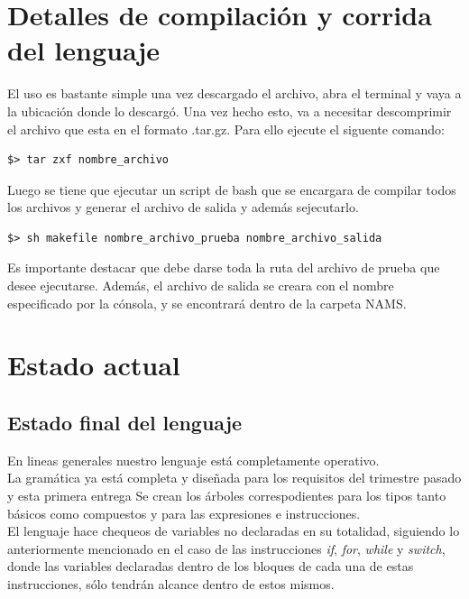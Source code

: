 \documentclass[11pt, spanish]{report}
\begin{document}
\chapter{Detalles de compilaci\'on y corrida del lenguaje}
El uso es bastante simple una vez descargado el archivo, abra el terminal y vaya a la ubicaci\'on donde lo descarg\'o. Una vez hecho esto, va a necesitar 
descomprimir el archivo que esta en el formato .tar.gz. Para ello ejecute el siguente comando:\\

\begin{verbatim}
$> tar zxf nombre_archivo
\end{verbatim}

Luego se tiene que ejecutar un script de bash que se encargara de compilar todos los archivos y generar el archivo
de salida y adem\'as sejecutarlo.\\

\begin{verbatim}
$> sh makefile nombre_archivo_prueba nombre_archivo_salida
\end{verbatim}

Es importante destacar que debe darse toda la ruta del archivo de prueba que desee ejecutarse. Adem\'as, el archivo
de salida se creara con el nombre especificado por la c\'onsola, y se encontrar\'a dentro de la carpeta NAMS.\\

\chapter{Estado actual}
\section{Estado final del lenguaje}
En lineas generales nuestro lenguaje est\'a completamente operativo.\\

La gram\'atica ya est\'a completa y dise\~nada para los requisitos del trimestre pasado y esta primera entrega Se crean los \'arboles correspodientes para los tipos tanto b\'asicos
como compuestos y para las expresiones e instrucciones.\\

El lenguaje hace chequeos de variables no declaradas en su totalidad, siguiendo lo anteriormente mencionado en el caso de las instrucciones \emph{if},
\emph{for}, \emph{while} y \emph{switch}, donde las variables declaradas dentro de los bloques de cada una de estas instrucciones, s\'olo tendr\'an 
alcance dentro de estos mismos.\\
\end{document}
